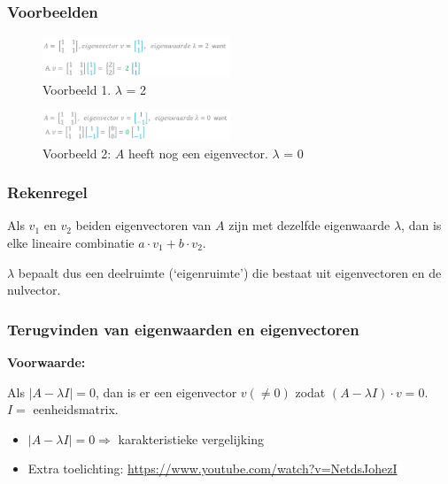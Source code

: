 \documentclass{article}
\begin{document}
\subsubsection{Voorbeelden}

\begin{figure}[H]
    \centering
    \includegraphics[width=0.5\textwidth]{eigenvector-voorbeeld.png}
    \caption{Voorbeeld 1. $\lambda$ = 2}
\end{figure}

\begin{figure}[H]
    \centering
    \includegraphics[width=0.5\textwidth]{eigenvector-voorbeeld2.png}
    \caption{Voorbeeld 2: $A$ heeft nog een eigenvector. $\lambda$ = 0}
\end{figure}


\subsubsection{Rekenregel}

Als $v_1$ en $v_2$ beiden eigenvectoren van $A$ zijn met dezelfde eigenwaarde $\lambda$, 
dan is elke lineaire combinatie $a \cdot v_1 + b \cdot v_2$.

$\lambda$ bepaalt dus een deelruimte (`eigenruimte') die bestaat uit eigenvectoren en de nulvector.

\subsubsection{Terugvinden van eigenwaarden en eigenvectoren}

\textbf{Voorwaarde:}

Als $|A - \lambda I| = 0$, dan is er een eigenvector $v (\neq 0)$ 
zodat $(A - \lambda I) \cdot v = 0$. $I =$ eenheidsmatrix.

\begin{itemize}
    \item $|A - \lambda I| = 0 \Rightarrow$ karakteristieke vergelijking 
    \item Extra toelichting: \url{https://www.youtube.com/watch?v=NetdsJohezI}
\end{itemize}
\end{document}
